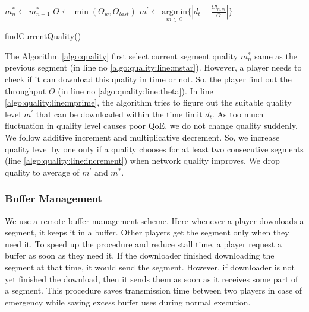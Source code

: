 \begin{algorithm}
	\DontPrintSemicolon
	$m^*_{n} \leftarrow m^*_{n-1}$ \; \label{algo:quality:line:mstar}
	$\varTheta \leftarrow \min(\varTheta_w, \varTheta_{last})$ \; \label{algo:quality:line:theta}
	$m^\prime \leftarrow \underset{m \in \mathcal{Q}}{\mathrm{argmin}} \{\left| d_t - \frac{Cl_{n,m}}{\varTheta}\right| \} $\; \label{algo:quality:line:mprime}
	\caption{\label{algo:quality}findCurrentQuality()}
\end{algorithm}
The Algorithm \ref{algo:quality} first select current segment quality $m^*_{n}$ same as the previous segment (in line no \ref{algo:quality:line:mstar}). However, a player needs to check if it can download this quality in time or not. So, the player find out the throughput $\varTheta$ (in line no \ref{algo:quality:line:theta}). In line \ref{algo:quality:line:mprime}, the algorithm tries to figure out the suitable quality level $m^\prime$ that can be downloaded within the time limit $d_t$. As too much fluctuation in quality level causes poor QoE, we do not change quality suddenly. We follow additive increment and multiplicative decrement. So, we increase quality level by one only if a quality chooses for at least two consecutive segments (line \ref{algo:quality:line:increment}) when network quality improves. We drop quality to average of $m^\prime$ and $m^*$. 


\subsubsection{Buffer Management}
We use a remote buffer management scheme. Here whenever a player downloads a segment, it keeps it in a buffer. Other players get the segment only when they need it. To speed up the procedure and reduce stall time, a player request a buffer as soon as they need it. If the downloader finished downloading the segment at that time, it would send the segment. However, if downloader is not yet finished the download, then it sends them as soon as it receives some part of a segment. This procedure saves transmission time between two players in case of emergency while saving excess buffer uses during normal execution.

